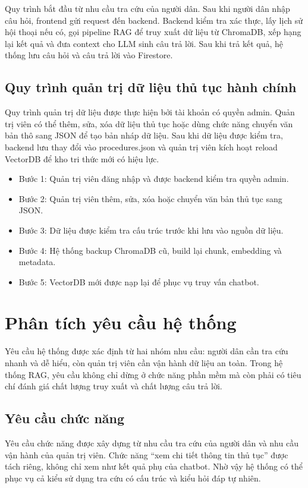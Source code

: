 Quy trình bắt đầu từ nhu cầu tra cứu của người dân. Sau khi người dân
nhập câu hỏi, frontend gửi request đến backend. Backend kiểm tra xác
thực, lấy lịch sử hội thoại nếu có, gọi pipeline RAG để truy xuất dữ
liệu từ ChromaDB, xếp hạng lại kết quả và đưa context cho LLM sinh câu
trả lời. Sau khi trả kết quả, hệ thống lưu câu hỏi và câu trả lời vào
Firestore.

\subsection{Quy trình quản trị dữ liệu thủ tục hành
chính}
Quy trình quản trị dữ liệu được thực hiện bởi tài khoản có quyền admin.
Quản trị viên có thể thêm, sửa, xóa dữ liệu thủ tục hoặc dùng chức năng
chuyển văn bản thô sang JSON để tạo bản nháp dữ liệu. Sau khi dữ liệu
được kiểm tra, backend lưu thay đổi vào procedures.json và quản trị viên
kích hoạt reload VectorDB để kho tri thức mới có hiệu lực.

\begin{itemize}
\item
  Bước 1: Quản trị viên đăng nhập và được backend kiểm tra quyền admin.
\item
  Bước 2: Quản trị viên thêm, sửa, xóa hoặc chuyển văn bản thủ tục sang
  JSON.
\item
  Bước 3: Dữ liệu được kiểm tra cấu trúc trước khi lưu vào nguồn dữ
  liệu.
\item
  Bước 4: Hệ thống backup ChromaDB cũ, build lại chunk, embedding và
  metadata.
\item
  Bước 5: VectorDB mới được nạp lại để phục vụ truy vấn chatbot.
\end{itemize}

\section{Phân tích yêu cầu hệ
thống}

Yêu cầu hệ thống được xác định từ hai nhóm nhu cầu: người dân cần tra
cứu nhanh và dễ hiểu, còn quản trị viên cần vận hành dữ liệu an toàn.
Trong hệ thống RAG, yêu cầu không chỉ dừng ở chức năng phần mềm mà còn
phải có tiêu chí đánh giá chất lượng truy xuất và chất lượng câu trả
lời.

\subsection{Yêu cầu chức
năng}
Yêu cầu chức năng được xây dựng từ nhu cầu tra cứu của người dân và nhu
cầu vận hành của quản trị viên. Chức năng ``xem chi tiết thông tin thủ
tục'' được tách riêng, không chỉ xem như kết quả phụ của chatbot. Nhờ
vậy hệ thống có thể phục vụ cả kiểu sử dụng tra cứu có cấu trúc và kiểu
hỏi đáp tự nhiên.

